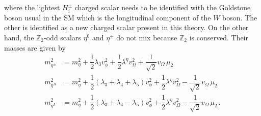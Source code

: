 \documentclass[12pt,letterpaper]{article}
\begin{document}
where the lightest $H_i^{\pm}$ charged scalar needs to be identified with the Goldstone boson usual in the SM which is the longitudinal component of the $W$ boson. The other is identified as a new charged scalar present in this theory.  
On the other hand, the $\mathbb{Z}_2$-odd scalars $\eta^0$ and $\eta^{\pm}$ do not mix because $\mathbb{Z}_2$ is conserved. Their masses are given by
\begin{align}
\label{eq:masa-etapm}
m_{\eta^\pm}^2 &= m_{\eta}^2 + \dfrac{1}{2}\lambda_3v_{\phi}^2 
+ \dfrac{1}{2}\lambda^{\eta}v_{\Omega}^2 + \dfrac{1}{\sqrt{2}}v_{\Omega}\,\mu_2 \\
\label{eq:masa-etaR}
m_{\eta^R}^2 &= m_{\eta}^2 + \dfrac{1}{2}\left(\lambda_3+\lambda_4+\lambda_5\right) v_{\phi}^2
+ \dfrac{1}{2}\lambda^{\eta}v_{\Omega}^2 - \dfrac{1}{\sqrt{2}}v_{\Omega}\,\mu_2 \\
\label{eq:masa-etapI}
m_{\eta^I}^2 &= m_{\eta}^2 + \dfrac{1}{2}\left(\lambda_3+\lambda_4-\lambda_5\right) v_{\phi}^2
+ \dfrac{1}{2}\lambda^{\eta}v_{\Omega}^2 - \dfrac{1}{\sqrt{2}}v_{\Omega}\,\mu_2\,.
\end{align}
\end{document}
